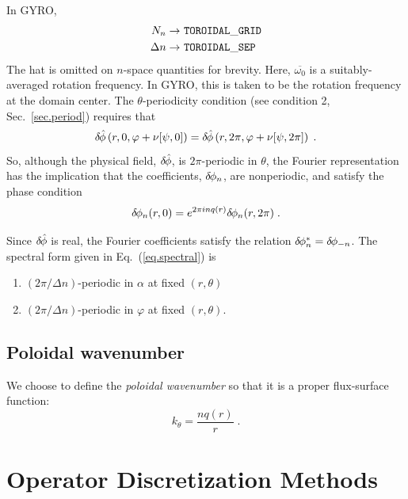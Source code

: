 \noindent
In GYRO, 
%
\begin{align*}
N_n \rightarrow &~{\tt TOROIDAL\_GRID} \\
\Delta n \rightarrow &~{\tt TOROIDAL\_SEP}
\end{align*}
%
The hat is omitted on $n$-space quantities for brevity.  Here, 
$\overline{\omega_0}$ is a suitably-averaged rotation frequency.  In
GYRO, this is taken to be the rotation frequency at the domain
center.  The $\theta$-periodicity condition (see condition 2, 
Sec.~\ref{sec.period}) requires that
%
\begin{equation} 
\delta \hskip -1pt \hat{\phi}\left(r,0,\varphi+\nu[\psi,0]\right) = 
\delta \hskip -1pt \hat{\phi}\left(r,2\pi,\varphi+\nu[\psi,2\pi]\right) \; .
\end{equation}
%
So, although the physical field, $\delta \hskip -1pt \hat{\phi}$, is $2\pi$-periodic in 
$\theta$, the Fourier representation has the implication that the 
coefficients, $\delta \hskip -1pt \phi_n$, are nonperiodic, and satisfy the phase 
condition 
%
\begin{equation}
\delta \hskip -1pt \phi_n(r,0) =  e^{2 \pi i n q(r)} \delta \hskip -1pt \phi_n(r,2\pi) \; . 
\label{eq.phase}
\end{equation}

\noindent
Since $\delta \hskip -1pt \hat{\phi}$ is real, the Fourier coefficients satisfy 
the relation $\delta \hskip -1pt \phi_n^* = \delta \hskip -1pt \phi_{-n}$.  The spectral form 
given in Eq.~(\ref{eq.spectral}) is 
\begin{enumerate}
\item
$(2\pi/\Delta n)$-periodic in $\alpha$ at fixed $(r,\theta)$ 
\item
$(2\pi/\Delta n)$-periodic in $\varphi$ at fixed $(r,\theta)$.
\end{enumerate}

\subsection{Poloidal wavenumber}

We choose to define the {\it poloidal wavenumber} so that it is a 
proper flux-surface function:
%
\begin{equation}
k_\theta = \frac{n q(r)}{r} \; .
\end{equation}

\section{Operator Discretization Methods}\label{sec.opdisc}

